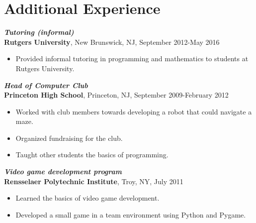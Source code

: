 \documentclass[letterpaper,12pt]{article}
\begin{document}
\iffalse
\section*{Extracurricular Activities}

\textit{\textbf{Head of Computer Club}} \\
\textbf{Princeton High School},
Princeton, NJ \\
September 2009--February 2012
\begin{itemize}
\item Worked with club members towards developing a robot that could
  navigate a maze.
\item Organized fundraising for the club.
\item Taught other students the basics of programming.
\end{itemize}
\fi

\iffalse
\section*{Additional Experience}

\textit{\textbf{Tutoring (informal)}} \\
\textbf{Rutgers University}, New Brunswick, NJ, September 2012-May
2016
\begin{itemize}
\item Provided informal tutoring in programming and mathematics to
  students at Rutgers University.
\end{itemize}

\textit{\textbf{Head of Computer Club}} \\
\textbf{Princeton High School}, Princeton, NJ, September 2009-February
2012
\begin{itemize}
\item Worked with club members towards developing a robot that could
  navigate a maze.
\item Organized fundraising for the club.
\item Taught other students the basics of programming.
\end{itemize}

\textit{\textbf{Video game development program}} \\
\textbf{Rensselaer Polytechnic Institute}, Troy, NY, July 2011
\begin{itemize}
\item Learned the basics of video game development.
\item Developed a small game in a team environment using Python and
  Pygame.
\end{itemize}
\end{document}
